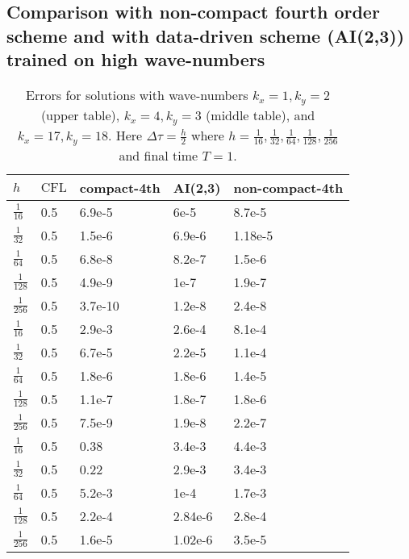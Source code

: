 \documentclass[12pt,reqno]{amsart}
\theoremstyle{definition}
\numberwithin{equation}{section}
\begin{document}
		\subsection{Comparison with non-compact fourth order scheme and with data-driven scheme (AI(2,3)) trained on high wave-numbers}
		\begin{table} [h!]
			\centering
			\begin{tabular}{|p{0.7cm}|p{0.7cm}|p{4cm}|p{4cm}|p{4cm}|}
				\hline
				$h$ & $\mathrm{CFL}$ &compact-4th& AI(2,3)&non-compact-4th
				\\ [0.5ex] 
				\hline 
				$\frac{1}{16}$ & 0.5& 6.9e-5&  6e-5&8.7e-5 \\[0.5mm]
				$\frac{1}{32}$ & 0.5 &1.5e-6 &6.9e-6&1.18e-5 \\[0.5mm]
				$\frac{1}{64}$ & 0.5 & 6.8e-8 &8.2e-7& 1.5e-6 \\[0.5mm]
				$\frac{1}{128}$ & 0.5 &4.9e-9 & 1e-7&1.9e-7 \\[0.5mm]
				$\frac{1}{256}$ & 0.5& 3.7e-10 &1.2e-8&2.4e-8 \\[0.5mm]
				\hline \hline
				$\frac{1}{16}$ & 0.5& 2.9e-3&  2.6e-4&8.1e-4 \\[0.5mm]
				$\frac{1}{32}$ & 0.5 &6.7e-5 &2.2e-5&1.1e-4 \\[0.5mm]
				$\frac{1}{64}$ & 0.5 & 1.8e-6 &1.8e-6& 1.4e-5 \\[0.5mm]
				$\frac{1}{128}$ & 0.5 &1.1e-7 & 1.8e-7&1.8e-6 \\[0.5mm]
				$\frac{1}{256}$ & 0.5& 7.5e-9 &1.9e-8&2.2e-7 \\[0.5mm]
				\hline \hline
				$\frac{1}{16}$ & 0.5& 0.38& 3.4e-3 &4.4e-3\\[0.5mm]
				$\frac{1}{32}$ & 0.5 &0.22 &2.9e-3&3.4e-3 \\[0.5mm]
				$\frac{1}{64}$ & 0.5 & 5.2e-3 &1e-4& 1.7e-3\\[0.5mm]
				$\frac{1}{128}$ & 0.5 &2.2e-4 & 2.84e-6&2.8e-4\\[0.5mm]
				$\frac{1}{256}$ & 0.5& 1.6e-5 &1.02e-6& 3.5e-5\\[0.5mm]
				\hline
			\end{tabular}
			\caption{ Errors for solutions  with wave-numbers $k_x=1,k_y=2$ (upper table), $k_x=4,k_y=3$ (middle table),
				and  $k_x=17,k_y=18$.
				Here $\Delta \tau=\frac{h}{2}$ where $h=\frac{1}{16},\frac{1}{32},\frac{1}{64},
				\frac{1}{128}, \frac{1}{256}
				$
				and final time $T=1$.}
			\label{table:conv_rates_3}
		\end{table}
		\newpage
\end{document}

